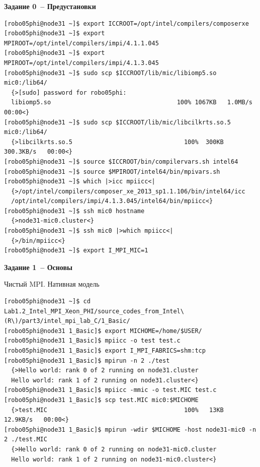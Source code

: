 \documentclass[pscyr,10pt]{hedlab}
\begin{document}
  \makeheader
  
  \begin{center}
    \textbf{Задание 0~-- Предустановки}
  \end{center}
  
\begin{lstlisting}
[robo05phi@node31 ~]$ export ICCROOT=/opt/intel/compilers/composerxe
[robo05phi@node31 ~]$ export MPIROOT=/opt/intel/compilers/impi/4.1.1.045
[robo05phi@node31 ~]$ export MPIROOT=/opt/intel/compilers/impi/4.1.3.045
[robo05phi@node31 ~]$ sudo scp $ICCROOT/lib/mic/libiomp5.so mic0:/lib64/
  {>[sudo] password for robo05phi:
  libiomp5.so                                   100% 1067KB   1.0MB/s   00:00<}
[robo05phi@node31 ~]$ sudo scp $ICCROOT/lib/mic/libcilkrts.so.5 mic0:/lib64/
  {>libcilkrts.so.5                               100%  300KB 300.3KB/s   00:00<}
[robo05phi@node31 ~]$ source $ICCROOT/bin/compilervars.sh intel64
[robo05phi@node31 ~]$ source $MPIROOT/intel64/bin/mpivars.sh
[robo05phi@node31 ~]$ which |>icc mpiicc<|
  {>/opt/intel/compilers/composer_xe_2013_sp1.1.106/bin/intel64/icc
  /opt/intel/compilers/impi/4.1.3.045/intel64/bin/mpiicc<}
[robo05phi@node31 ~]$ ssh mic0 hostname
  {>node31-mic0.cluster<}
[robo05phi@node31 ~]$ ssh mic0 |>which mpiicc<|
  {>/bin/mpiicc<}
[robo05phi@node31 ~]$ export I_MPI_MIC=1
\end{lstlisting}
  
  \begin{center}
    \textbf{Задание 1~-- Основы}
    
    Чистый MPI. Нативная модель
  \end{center}

\begin{lstlisting}
[robo05phi@node31 ~]$ cd Lab1.2_Intel_MPI_Xeon_PHI/source_codes_from_Intel\(R\)/part3/intel_mpi_lab_C/1_Basic/
[robo05phi@node31 1_Basic]$ export MICHOME=/home/$USER/
[robo05phi@node31 1_Basic]$ mpiicc -o test test.c
[robo05phi@node31 1_Basic]$ export I_MPI_FABRICS=shm:tcp
[robo05phi@node31 1_Basic]$ mpirun -n 2 ./test
  {>Hello world: rank 0 of 2 running on node31.cluster
  Hello world: rank 1 of 2 running on node31.cluster<}
[robo05phi@node31 1_Basic]$ mpiicc -mmic -o test.MIC test.c
[robo05phi@node31 1_Basic]$ scp test.MIC mic0:$MICHOME
  {>test.MIC                                      100%   13KB  12.9KB/s   00:00<}
[robo05phi@node31 1_Basic]$ mpirun -wdir $MICHOME -host node31-mic0 -n 2 ./test.MIC
  {>Hello world: rank 0 of 2 running on node31-mic0.cluster
  Hello world: rank 1 of 2 running on node31-mic0.cluster<}
\end{lstlisting}
  
\end{document}
